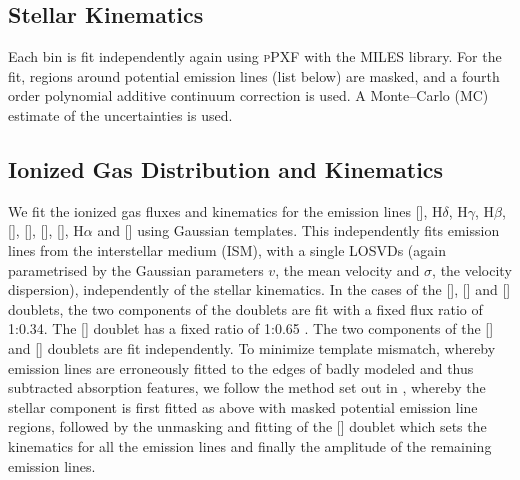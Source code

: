\documentclass[a4paper,fleqn,usenatbib]{mnras}
\begin{document}
	\subsection{Stellar Kinematics}
		\label{subsec:starKin}
		Each bin is fit independently again using \textsc{pPXF} with the MILES library. For the fit, regions around potential emission lines (list below) are masked, and a fourth order polynomial additive continuum correction is used. A Monte--Carlo (MC) estimate of the uncertainties is used. 

	\subsection{Ionized Gas Distribution and Kinematics}
		\label{subsec:EmissionLines}
		We fit the ionized gas fluxes and kinematics for the emission lines [], H$\delta$, H$\gamma$, H$\beta$, [], [], [], [], H$\alpha$ and [] using Gaussian templates. This independently fits emission lines from the interstellar medium (ISM), with a single LOSVDs (again parametrised by the Gaussian parameters $v$, the mean velocity and $\sigma$, the velocity dispersion), independently of the stellar kinematics. In the cases of the [], [] and [] doublets, the two components of the doublets are fit with a fixed flux ratio of 1:0.34. The [] doublet has a fixed ratio of 1:0.65 \citep{Safier1992}. The two components of the [] and [] doublets are fit independently. To minimize template mismatch, whereby emission lines are erroneously fitted to the edges of badly modeled and thus subtracted absorption features, we follow the method set out in \citet{Sarzi2005}, whereby the stellar component is first fitted as above with masked potential emission line regions, followed by the unmasking and fitting of the [] doublet which sets the kinematics for all the emission lines and finally the amplitude of the remaining emission lines. %
\end{document}
